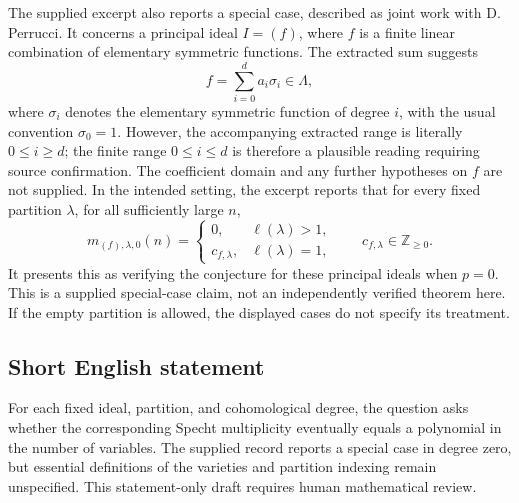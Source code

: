 \documentclass[11pt]{article}
\newcommand{\Z}{\mathbb{Z}}
\begin{document}
The supplied excerpt also reports a special case, described as joint work with D. Perrucci. It concerns a principal ideal \(I=(f)\), where \(f\) is a finite linear combination of elementary symmetric functions. The extracted sum suggests
\[
f=\sum_{i=0}^{d}a_i\sigma_i\in\Lambda,
\]
where \(\sigma_i\) denotes the elementary symmetric function of degree \(i\), with the usual convention \(\sigma_0=1\). However, the accompanying extracted range is literally \(0\leq i\geq d\); the finite range \(0\leq i\leq d\) is therefore a plausible reading requiring source confirmation. The coefficient domain and any further hypotheses on \(f\) are not supplied. In the intended setting, the excerpt reports that for every fixed partition \(\lambda\), for all sufficiently large \(n\),
\[
m_{(f),\lambda,0}(n)=
\begin{cases}
0,&\ell(\lambda)>1,\\
c_{f,\lambda},&\ell(\lambda)=1,
\end{cases}
\qquad c_{f,\lambda}\in\Z_{\geq0}.
\]
It presents this as verifying the conjecture for these principal ideals when \(p=0\). This is a supplied special-case claim, not an independently verified theorem here. If the empty partition is allowed, the displayed cases do not specify its treatment.
\subsection{Short English statement}
For each fixed ideal, partition, and cohomological degree, the question asks whether the corresponding Specht multiplicity eventually equals a polynomial in the number of variables. The supplied record reports a special case in degree zero, but essential definitions of the varieties and partition indexing remain unspecified. This statement-only draft requires human mathematical review.
\end{document}
